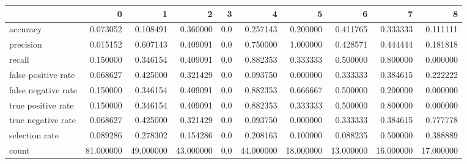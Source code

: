 \begin{tabular}{lrrrrrrrrr}
\toprule
{} &          0 &          1 &          2 &    3 &          4 &          5 &          6 &          7 &          8 \\
\midrule
accuracy            &   0.073052 &   0.108491 &   0.360000 &  0.0 &   0.257143 &   0.200000 &   0.411765 &   0.333333 &   0.111111 \\
precision           &   0.015152 &   0.607143 &   0.409091 &  0.0 &   0.750000 &   1.000000 &   0.428571 &   0.444444 &   0.181818 \\
recall              &   0.150000 &   0.346154 &   0.409091 &  0.0 &   0.882353 &   0.333333 &   0.500000 &   0.800000 &   0.000000 \\
false positive rate &   0.068627 &   0.425000 &   0.321429 &  0.0 &   0.093750 &   0.000000 &   0.333333 &   0.384615 &   0.222222 \\
false negative rate &   0.150000 &   0.346154 &   0.409091 &  0.0 &   0.882353 &   0.666667 &   0.500000 &   0.200000 &   0.000000 \\
true positive rate  &   0.150000 &   0.346154 &   0.409091 &  0.0 &   0.882353 &   0.333333 &   0.500000 &   0.800000 &   0.000000 \\
true negative rate  &   0.068627 &   0.425000 &   0.321429 &  0.0 &   0.093750 &   0.000000 &   0.333333 &   0.384615 &   0.777778 \\
selection rate      &   0.089286 &   0.278302 &   0.154286 &  0.0 &   0.208163 &   0.100000 &   0.088235 &   0.500000 &   0.388889 \\
count               &  81.000000 &  49.000000 &  43.000000 &  0.0 &  44.000000 &  18.000000 &  13.000000 &  16.000000 &  17.000000 \\
\bottomrule
\end{tabular}
